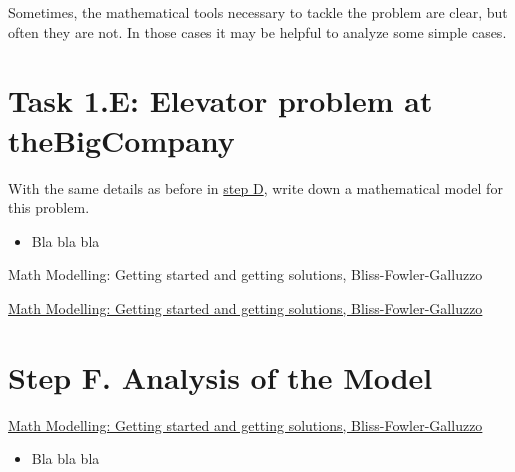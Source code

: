 Sometimes, the mathematical tools necessary to tackle the problem are clear, but often they are not. In those cases it may be helpful to analyze some simple cases.









\vfill



\section*{Task 1.E: Elevator problem at theBigCompany}


With the same details as before in \hyperref[D-parvsvar]{step D}, write down a mathematical model for this problem.









\begin{module}
	
	\begin{itemize}
		\item Bla bla bla	
	\end{itemize}
	

\begin{annotation}
	\begin{goals}
	Math Modelling: Getting started and getting solutions, Bliss-Fowler-Galluzzo
	
	\hfill {}	
	\end{goals}
\end{annotation}
	 \href{https://m3challenge.siam.org/resources/modeling-handbook}{Math Modelling: Getting started and getting solutions, Bliss-Fowler-Galluzzo}

\end{module}


\section*{Step F. Analysis of the Model}\label{F-analysis}




\begin{module}
	 \href{https://m3challenge.siam.org/resources/modeling-handbook}{Math Modelling: Getting started and getting solutions, Bliss-Fowler-Galluzzo}
	
	\begin{itemize}
		\item Bla bla bla	
	\end{itemize}
	


\end{module}

